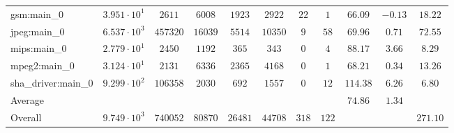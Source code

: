 \begin{tabular}{|l|c|c|c|c|c|c|c|c|c|c|}
gsm:main\_0             & $ 3.951 \cdot 10^{1} $ & $ 2611   $ & $ 6008  $ & $ 1923  $ & $ 2922  $ & $ 22  $ & $ 1   $ & $ 66.09       $ & $ -0.13   $ & $ 18.22   $ \\
jpeg:main\_0            & $ 6.537 \cdot 10^{3} $ & $ 457320 $ & $ 16039 $ & $ 5514  $ & $ 10350 $ & $ 9   $ & $ 58  $ & $ 69.96       $ & $ 0.71    $ & $ 72.55   $ \\
mips:main\_0            & $ 2.779 \cdot 10^{1} $ & $ 2450   $ & $ 1192  $ & $ 365   $ & $ 343   $ & $ 0   $ & $ 4   $ & $ 88.17       $ & $ 3.66    $ & $ 8.29    $ \\
mpeg2:main\_0           & $ 3.124 \cdot 10^{1} $ & $ 2131   $ & $ 6336  $ & $ 2365  $ & $ 4168  $ & $ 0   $ & $ 1   $ & $ 68.21       $ & $ 0.34    $ & $ 13.26   $ \\
sha\_driver:main\_0     & $ 9.299 \cdot 10^{2} $ & $ 106358 $ & $ 2030  $ & $ 692   $ & $ 1557  $ & $ 0   $ & $ 12  $ & $ 114.38      $ & $ 6.26    $ & $ 6.80    $ \\
\hline
Average                 & $                    $ & $        $ & $       $ & $       $ & $       $ & $     $ & $     $ & $ 74.86       $ & $ 1.34    $ & $         $ \\
\hline
Overall                 & $ 9.749 \cdot 10^{3} $ & $ 740052 $ & $ 80870 $ & $ 26481 $ & $ 44708 $ & $ 318 $ & $ 122 $ & $             $ & $         $ & $ 271.10  $ \\
\hline
\end{tabular}
